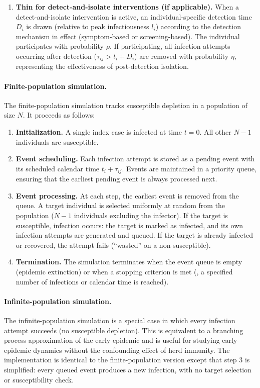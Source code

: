 \begin{enumerate}
	\item \textbf{Thin for detect-and-isolate interventions (if applicable).} When a detect-and-isolate intervention is active, an individual-specific detection time $D_i$ is drawn (relative to peak infectiousness $l_i$) according to the detection mechanism in effect (symptom-based or screening-based). The individual participates with probability $\rho$. If participating, all infection attempts occurring after detection ($\tau_{ij} > t_i + D_i$) are removed with probability $\eta$, representing the effectiveness of post-detection isolation.
\end{enumerate}

\paragraph{Finite-population simulation.}
The finite-population simulation tracks susceptible depletion in a population of size $N$. It proceeds as follows:
\begin{enumerate}
	\item \textbf{Initialization.} A single index case is infected at time $t = 0$. All other $N-1$ individuals are susceptible.
	\item \textbf{Event scheduling.} Each infection attempt is stored as a pending event with its scheduled calendar time $t_i + \tau_{ij}$. Events are maintained in a priority queue, ensuring that the earliest pending event is always processed next.
	\item \textbf{Event processing.} At each step, the earliest event is removed from the queue. A target individual is selected uniformly at random from the population ($N - 1$ individuals excluding the infector). If the target is susceptible, infection occurs: the target is marked as infected, and its own infection attempts are generated and queued. If the target is already infected or recovered, the attempt fails (``wasted'' on a non-susceptible).
	\item \textbf{Termination.} The simulation terminates when the event queue is empty (epidemic extinction) or when a stopping criterion is met (\eg, a specified number of infections or calendar time is reached).
\end{enumerate}

\paragraph{Infinite-population simulation.}
The infinite-population simulation is a special case in which every infection attempt succeeds (no susceptible depletion). This is equivalent to a branching process approximation of the early epidemic and is useful for studying early-epidemic dynamics without the confounding effect of herd immunity. The implementation is identical to the finite-population version except that step 3 is simplified: every queued event produces a new infection, with no target selection or susceptibility check.

